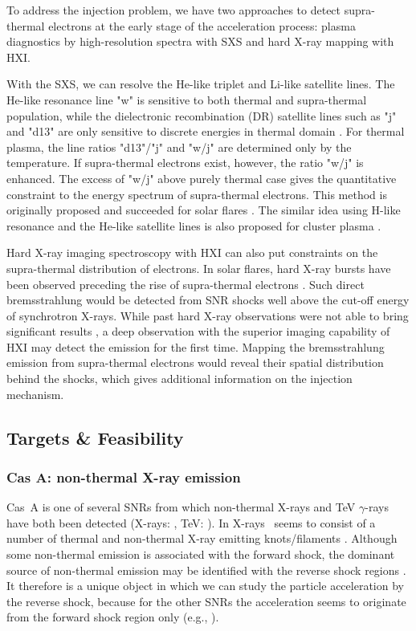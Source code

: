 \documentclass[11pt,a4paper]{article}
\begin{document}
{To address the injection problem, we have two approaches to detect
supra-thermal electrons at the early stage of the acceleration process:
plasma diagnostics by high-resolution spectra with SXS and hard X-ray
mapping with HXI.

With the SXS, we can resolve the He-like triplet and Li-like satellite
lines.  The He-like resonance line "w" is sensitive to both thermal
and supra-thermal population, while the dielectronic recombination (DR)
satellite lines such as "j" and "d13" are only sensitive to discrete
energies in thermal domain \citep{1979MNRAS.189..319G}.  For thermal
plasma, the line ratios "d13"/"j" and "w/j" are determined only by the
temperature. If supra-thermal electrons exist, however, the ratio "w/j"
is enhanced. The excess of "w/j" above purely thermal case gives the
quantitative constraint to the energy spectrum of supra-thermal
electrons. This method is originally proposed and succeeded for solar
flares \citep{1979MNRAS.189..319G, 1987ApJ...319..541S}. The similar
idea using H-like resonance and the He-like satellite lines is also
proposed for cluster plasma \citep{2009A&A...503..373K}.

Hard X-ray imaging spectroscopy with HXI can also put constraints on the
supra-thermal distribution of electrons. In solar flares, hard X-ray
bursts have been observed preceding the rise of supra-thermal electrons
\citep{1987ApJ...319..541S}.  Such direct bremsstrahlung would be
detected from SNR shocks well above the cut-off energy of synchrotron
X-rays.  While past hard X-ray observations were not able to bring
significant results \citep{2006ApJ...644..274K, 2008A&A...486..837V},
a deep observation with the superior imaging capability of HXI may detect
the emission for the first time. Mapping the bremsstrahlung emission
from supra-thermal electrons would reveal their spatial distribution
behind the shocks, which gives additional information on the injection
mechanism.

\subsection{Targets \& Feasibility}

\subsubsection{Cas A: non-thermal X-ray emission } \label{subsec:casanontherm}


Cas~A is one of several SNRs from which non-thermal X-rays and TeV
$\gamma$-rays have both been detected
(X-rays: \citealt{Allen97,Uchiyama08}, TeV: \citealt{Aharonian01,Albert07}).
In X-rays \casa\ seems to consist of a number of thermal and
non-thermal X-ray emitting knots/filaments
\citep{hughes00b,hwang04,Bamba05a}. Although some non-thermal emission
is associated with the forward shock, the dominant source of
non-thermal emission may be identified with the reverse shock regions
\citep{Helder08,Maeda09}.  It therefore is a unique object in which
we can study the particle acceleration by the reverse shock, because
for the other SNRs the acceleration seems to originate from the
forward shock region only (e.g., \citealt{Parizot06}).

}
\end{document}
